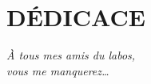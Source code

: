\chapter*{DÉDICACE}\thispagestyle{headings}
\begin{flushright}
  \itshape
  À tous mes amis du labos,\\
  vous me manquerez\ldots
\end{flushright}
